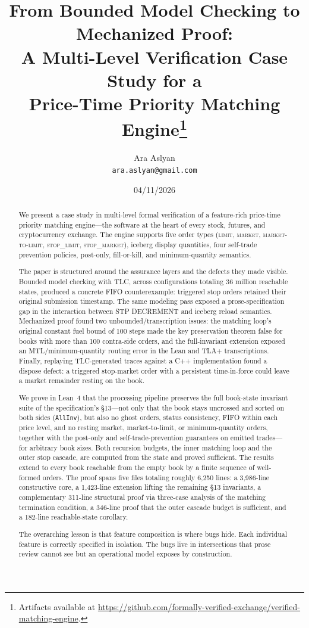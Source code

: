 \documentclass[11pt,a4paper]{article}
\title{From Bounded Model Checking to Mechanized Proof:\\
A Multi-Level Verification Case Study for a\\
Price-Time Priority Matching Engine\thanks{Artifacts available at
\url{https://github.com/formally-verified-exchange/verified-matching-engine}.}}
\author{%
  Ara Aslyan\\
  \texttt{ara.aslyan@gmail.com}
}
\date{04/11/2026}
\begin{document}
\maketitle

\begin{abstract}
We present a case study in multi-level formal verification of a
feature-rich price-time priority matching engine---the software at the
heart of every stock, futures, and cryptocurrency exchange. The engine
supports five order types (\textsc{limit}, \textsc{market},
\textsc{market-to-limit}, \textsc{stop\_limit}, \textsc{stop\_market}),
iceberg display quantities, four self-trade prevention policies,
post-only, fill-or-kill, and minimum-quantity semantics.

The paper is structured around the assurance layers and the defects they
made visible. Bounded model checking with TLC, across configurations
totaling 36 million reachable states, produced a concrete FIFO
counterexample: triggered stop orders retained their original submission
timestamp. The same modeling pass exposed a prose-specification gap in
the interaction between STP DECREMENT and iceberg reload semantics.
Mechanized proof found two unbounded/transcription issues: the matching
loop's original constant fuel bound of 100 steps made the key
preservation theorem false for books with more than 100 contra-side
orders, and the full-invariant extension exposed an MTL/minimum-quantity
routing error in the Lean and TLA+ transcriptions. Finally, replaying
TLC-generated traces against a C++ implementation found a dispose defect:
a triggered stop-market order with a persistent time-in-force could
leave a market remainder resting on the book.

We prove in Lean~4 that the processing pipeline preserves the full
book-state invariant suite of the specification's \S13---not only that
the book stays uncrossed and sorted on both sides (\texttt{AllInv}), but
also no ghost orders, status consistency, FIFO within each price level,
and no resting market, market-to-limit, or minimum-quantity orders,
together with the post-only and self-trade-prevention guarantees on
emitted trades---for arbitrary book sizes. Both recursion budgets, the
inner matching loop and the outer stop cascade, are computed from the
state and proved sufficient. The results extend to every book reachable
from the empty book by a finite sequence of well-formed orders. The
proof spans five files totaling roughly 6{,}250 lines: a 3{,}986-line
constructive core, a 1{,}423-line extension lifting the remaining \S13
invariants, a complementary 311-line structural proof via three-case
analysis of the matching termination condition, a 346-line proof that
the outer cascade budget is sufficient, and a 182-line reachable-state
corollary.

The overarching lesson is that feature composition is where bugs hide.
Each individual feature is correctly specified in isolation. The bugs
live in intersections that prose review cannot see but an operational
model exposes by construction.
\end{abstract}
\end{document}
